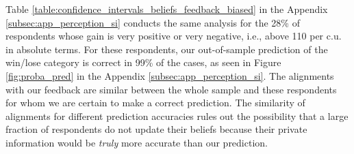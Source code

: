 \documentclass[12pt]{article} %
\begin{document}

Table \ref{table:confidence_intervals_beliefs_feedback_biased} in the Appendix \ref{subsec:app_perception_si} conducts the same analysis for the 28\% of respondents whose gain is very positive or very negative, i.e., above 110\euros{} per c.u. in absolute terms. For these respondents, our out-of-sample prediction of the win/lose category is correct in 99\% of the cases, as seen in Figure \ref{fig:proba_pred} in the Appendix \ref{subsec:app_perception_si}. The alignments with our feedback are similar between the whole sample and these respondents for whom we are certain to make a correct prediction. The similarity of alignments for different prediction accuracies rules out the possibility that a large fraction of respondents do not update their beliefs because their private information would be \textit{truly} more accurate than our prediction.
\end{document}
